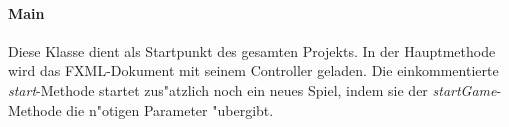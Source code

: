 \paragraph{Main}
\label{par:main}
Diese Klasse dient als Startpunkt des gesamten Projekts. In der Hauptmethode wird das FXML-Dokument mit seinem Controller geladen. Die einkommentierte \emph{start}-Methode startet zus"atzlich noch ein neues Spiel, indem sie der \emph{startGame}-Methode die n"otigen Parameter "ubergibt. 
